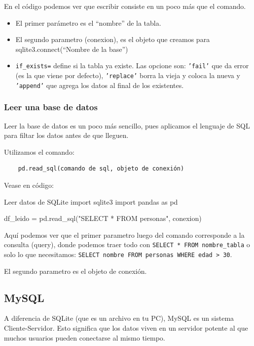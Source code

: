 En el código podemos ver que escribir consiste en un poco más que el comando.
\begin{itemize}
    \item El primer parámetro es el ``nombre'' de la tabla.
    \item El segundo parametro (conexion), es el objeto que creamos para sqlite3.connect(``Nombre de la base'')
    \item \texttt{if\_exists=} define si la tabla ya existe. Las opcione son: \texttt{'fail'} que da error (es la que viene por defecto), \texttt{'replace'} borra la vieja y coloca la nueva y \texttt{'append'} que agrega los datos al final de los existentes.
\end{itemize}

\subsubsection{Leer una base de datos}

Leer la base de datos es un poco más sencillo, pues aplicamos el lenguaje de SQL para filtar los datos antes de que lleguen. 

Utilizamos el comando:
\begin{verbatim}
    pd.read_sql(comando de sql, objeto de conexión)
\end{verbatim}

Vease en código:
\begin{pycode}{Leer datos de SQLite}
import sqlite3
import pandas as pd

df_leido = pd.read_sql("SELECT * FROM personas", conexion)
\end{pycode}

Aquí podemos ver que el primer parametro luego del comando corresponde a la consulta (query), donde podemos traer todo con \texttt{SELECT * FROM nombre\_tabla} o solo lo que necesitamos: \texttt{SELECT nombre FROM personas WHERE edad > 30}.

El segundo parametro es el objeto de conexión.




\subsection{MySQL}

A diferencia de SQLite (que es un archivo en tu PC), MySQL es un sistema Cliente-Servidor. Esto significa que los datos viven en un servidor potente al que muchos usuarios pueden conectarse al mismo tiempo.

